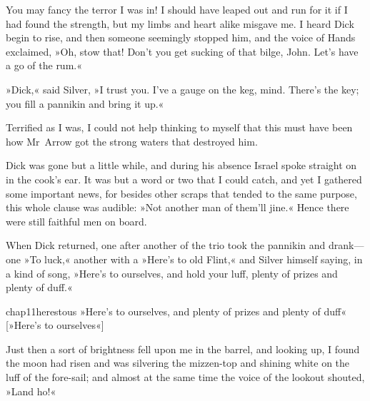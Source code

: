 You may fancy the terror I was in! I should have leaped out and run for it if I had found the strength, but my limbs and heart alike misgave me. I heard Dick begin to rise, and then someone seemingly stopped him, and the voice of Hands exclaimed, »Oh, stow that! Don't you get sucking of that bilge, John. Let's have a go of the rum.«

»Dick,« said Silver, »I trust you. I've a gauge on the keg, mind. There's the key; you fill a pannikin and bring it up.«

Terrified as I was, I could not help thinking to myself that this must have been how Mr~Arrow got the strong waters that destroyed him.

Dick was gone but a little while, and during his absence Israel spoke straight on in the cook's ear. It was but a word or two that I could catch, and yet I gathered some important news, for besides other scraps that tended to the same purpose, this whole clause was audible: »Not another man of them'll jine.« Hence there were still faithful men on board.

When Dick returned, one after another of the trio took the pannikin and drank—one »To luck,« another with a »Here's to old Flint,« and Silver himself saying, in a kind of song, »Here's to ourselves, and hold your luff, plenty of prizes and plenty of duff.«


\begin{bwbigpic}
	[\picsize]
	{chap11herestous}
	{»Here's to ourselves, and plenty of prizes and plenty of duff«}
	[»Here's to ourselves«]
\end{bwbigpic}

Just then a sort of brightness fell upon me in the barrel, and looking up, I found the moon had risen and was silvering the mizzen-top and shining white on the luff of the fore-sail; and almost at the same time the voice of the lookout shouted, »Land ho!«
